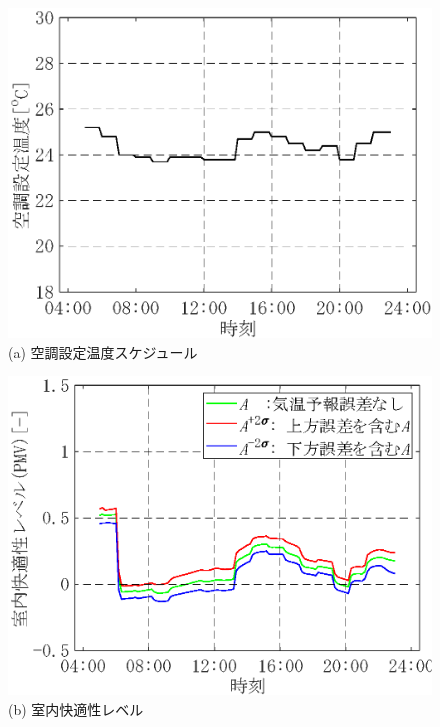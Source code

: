 \begin{figure}[htbp]
    \begin{center}
        \begin{minipage}{0.5\textwidth}
            \begin{center}
                \includegraphics[width=1\textwidth,keepaspectratio=true]{fig/robust_result_schedule_2obj_setting.eps}\\(a) 空調設定温度スケジュール
            \end{center}
        \end{minipage}
        \begin{minipage}{0.5\textwidth}
            \begin{center}
                \includegraphics[width=1\textwidth,keepaspectratio=true]{fig/robust_result_schedule_2obj_comfort.eps}\\(b) 室内快適性レベル

\end{center}
\end{minipage}
\end{center}
\end{figure}

